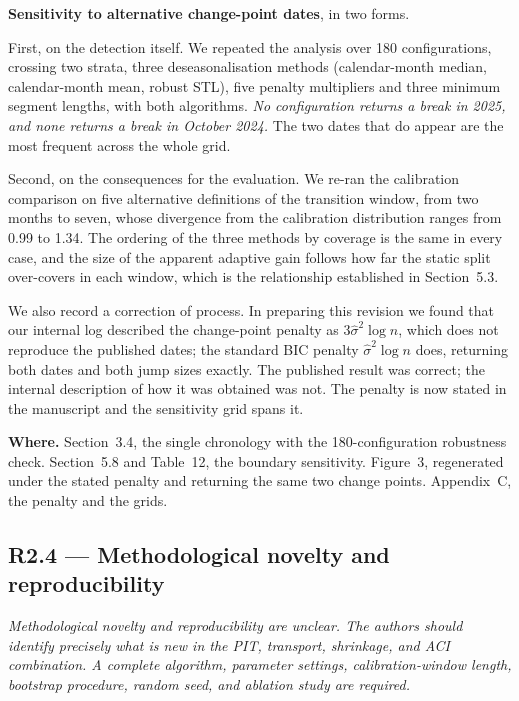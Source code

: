 \documentclass[11pt,a4paper]{article}
\newenvironment{revcomment}
  {\begin{mdframed}[backgroundcolor=quotebg,linecolor=quoterule,linewidth=0.4pt,
    innertopmargin=6pt,innerbottommargin=6pt,skipabove=8pt,skipbelow=8pt]\itshape}
  {\end{mdframed}}
\newcommand{\where}[1]{\textbf{Where.} #1}
\begin{document}
\textbf{Sensitivity to alternative change-point dates}, in two forms.

First, on the detection itself. We repeated the analysis over 180 configurations, crossing two strata, three deseasonalisation methods (calendar-month median, calendar-month mean, robust STL), five penalty multipliers and three minimum segment lengths, with both algorithms. \emph{No configuration returns a break in 2025, and none returns a break in October 2024.} The two dates that do appear are the most frequent across the whole grid.

Second, on the consequences for the evaluation. We re-ran the calibration comparison on five alternative definitions of the transition window, from two months to seven, whose divergence from the calibration distribution ranges from 0.99 to 1.34. The ordering of the three methods by coverage is the same in every case, and the size of the apparent adaptive gain follows how far the static split over-covers in each window, which is the relationship established in Section~5.3.

We also record a correction of process. In preparing this revision we found that our internal log described the change-point penalty as $3\hat\sigma^2\log n$, which does not reproduce the published dates; the standard BIC penalty $\hat\sigma^2\log n$ does, returning both dates and both jump sizes exactly. The published result was correct; the internal description of how it was obtained was not. The penalty is now stated in the manuscript and the sensitivity grid spans it.

\where{Section~3.4, the single chronology with the 180-configuration robustness check. Section~5.8 and Table~12, the boundary sensitivity. Figure~3, regenerated under the stated penalty and returning the same two change points. Appendix~C, the penalty and the grids.}

\subsection*{R2.4 --- Methodological novelty and reproducibility}

\begin{revcomment}
Methodological novelty and reproducibility are unclear. The authors should identify precisely what is new in the PIT, transport, shrinkage, and ACI combination. A complete algorithm, parameter settings, calibration-window length, bootstrap procedure, random seed, and ablation study are required.
\end{revcomment}
\end{document}
